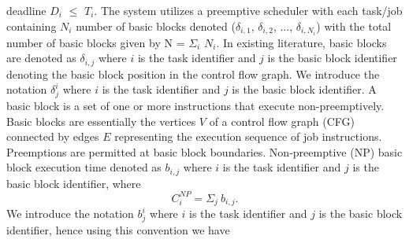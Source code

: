 deadline \begin{math}D_{i}\end{math} \begin{math}\leq\end{math} \begin{math}T_{i}\end{math}.  The system utilizes a preemptive scheduler with each task/job containing \begin{math}N_{i}\end{math} number of basic blocks denoted (\begin{math}\delta_{i,1}\end{math}, \begin{math}\delta_{i,2}\end{math}, ..., \begin{math}\delta_{i,N_{i}}\end{math}) with the total number of basic blocks given by N = \begin{math}\Sigma_{i}\end{math} \begin{math}N_{i}\end{math}. In existing literature, basic blocks are denoted as \begin{math}\delta_{i,j}\end{math} where $i$ is the task identifier and $j$ is the basic block identifier denoting the basic block position in the control flow graph.  We introduce the notation \begin{math}\delta_{j}^{i}\end{math} where $i$ is the task identifier and $j$ is the basic block identifier. A basic block is a set of one or more instructions that execute non-preemptively.  Basic blocks are essentially the vertices $V$ of a control flow graph (CFG) connected by edges $E$ representing the execution sequence of job instructions. Preemptions are permitted at basic block boundaries.  Non-preemptive (NP) basic block execution time denoted as \begin{math}b_{i,j}\end{math} where $i$ is the task identifier and $j$ is the basic block identifier, where
\begin{equation}\label{eqn:c-np1}
    C_{i}^{NP} = \Sigma_{j}\ b_{i,j}.
\end{equation}
\noindent
We introduce the notation \begin{math}b_{j}^{i}\end{math} where $i$ is the task identifier and $j$ is the basic block identifier, hence using this convention we have
